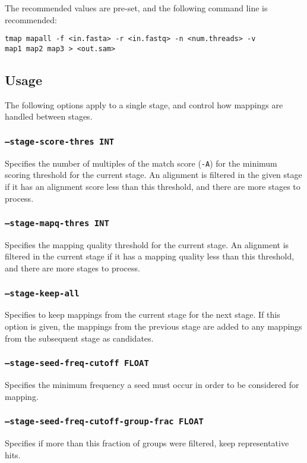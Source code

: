 \documentclass[a4paper,12pt]{book}
\newcommand{\TT}[1]{{\tt #1}} %
\begin{document}
The recommended values are pre-set, and the following command line is recommended:
\begin{verbatim}
tmap mapall -f <in.fasta> -r <in.fastq> -n <num.threads> -v 
map1 map2 map3 > <out.sam>
\end{verbatim}

\subsection{Usage}
The following options apply to a single stage, and control how mappings are handled between stages.
\subsubsection{\TT{--stage-score-thres INT}}
Specifies the number of multiples of the match score (\TT{-A}) for the minimum scoring threshold for the current  stage.
An alignment is filtered in the given stage if it has an alignment score less than this threshold, and there are more stages to process.
\subsubsection{\TT{--stage-mapq-thres INT}}
Specifies the mapping quality threshold for the current stage.
An alignment is filtered in the current stage if it has a mapping quality less than this threshold, and there are more stages to process.
\subsubsection{\TT{--stage-keep-all}}
Specifies to keep mappings from the current stage for the next stage.
If this option is given, the mappings from the previous stage are added to any mappings from the subsequent stage as candidates.

\subsubsection{\TT{--stage-seed-freq-cutoff FLOAT}}
Specifies the minimum frequency a seed must occur in order to be considered for mapping.

\subsubsection{\TT{--stage-seed-freq-cutoff-group-frac FLOAT}}
Specifies if more than this fraction of groups were filtered, keep representative hits.
                  
\end{document}
